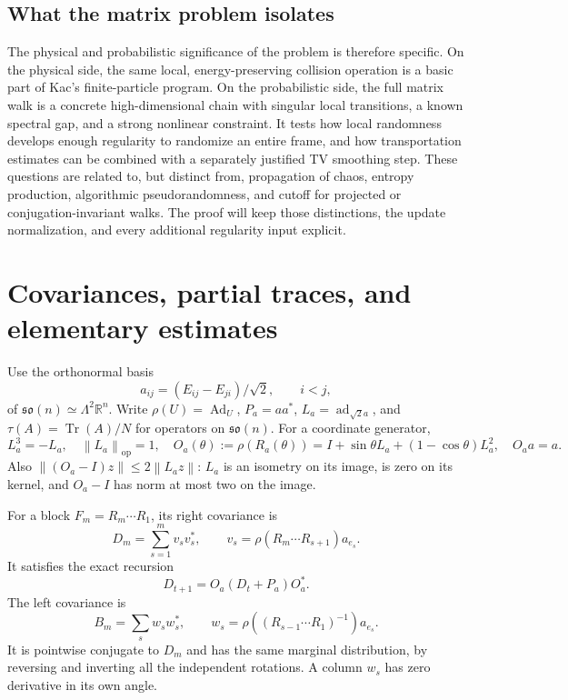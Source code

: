 \documentclass[11pt]{article}
\theoremstyle{definition}\newtheorem{definition}[theorem]{Definition}
\theoremstyle{remark}\newtheorem{remark}[theorem]{Remark}
\DeclareMathOperator{\Tr}{Tr}
\DeclareMathOperator{\Ad}{Ad}
\DeclareMathOperator{\ad}{ad}
\newcommand{\g}{\mathfrak{so}(n)}
\newcommand{\op}{\mathrm{op}}
\newcommand{\norm}[1]{\left\lVert#1\right\rVert}
\begin{document}
\subsection{What the matrix problem isolates}
The physical and probabilistic significance of the problem is therefore specific. On the physical side, the same local, energy-preserving collision operation is a basic part of Kac's finite-particle program. On the probabilistic side, the full matrix walk is a concrete high-dimensional chain with singular local transitions, a known spectral gap, and a strong nonlinear constraint. It tests how local randomness develops enough regularity to randomize an entire frame, and how transportation estimates can be combined with a separately justified TV smoothing step. These questions are related to, but distinct from, propagation of chaos, entropy production, algorithmic pseudorandomness, and cutoff for projected or conjugation-invariant walks. The proof will keep those distinctions, the update normalization, and every additional regularity input explicit.


\section{Covariances, partial traces, and elementary estimates}\label{sec:elementary}
Use the orthonormal basis
\[
 a_{ij}=(E_{ij}-E_{ji})/\sqrt2,\qquad i<j,
\]
of $\g\simeq\Lambda^2\mathbb R^n$. Write $\rho(U)=\Ad_U$, $P_a=aa^*$, $L_a=\ad_{\sqrt2a}$, and $\tau(A)=\Tr(A)/N$ for operators on $\g$. For a coordinate generator,
\begin{equation}\label{eq:coordinate-rotation}
 L_a^3=-L_a,\quad \norm{L_a}_{\op}=1,\quad
 O_a(\theta):=\rho(R_a(\theta))
 =I+\sin\theta L_a+(1-\cos\theta)L_a^2,\quad O_a a=a.
\end{equation}
Also $\norm{(O_a-I)z}\le2\norm{L_a z}$: $L_a$ is an isometry on its image, is zero on its kernel, and $O_a-I$ has norm at most two on the image.

For a block $F_m=R_m\cdots R_1$, its right covariance is
\[
 D_m=\sum_{s=1}^m v_sv_s^*,\qquad
 v_s=\rho(R_m\cdots R_{s+1})a_{e_s}.
\]
It satisfies the exact recursion
\begin{equation}\label{eq:cov-recursion}
 D_{t+1}=O_a(D_t+P_a)O_a^*.
\end{equation}
The left covariance is
\[
 B_m=\sum_s w_sw_s^*,\qquad
 w_s=\rho((R_{s-1}\cdots R_1)^{-1})a_{e_s}.
\]
It is pointwise conjugate to $D_m$ and has the same marginal distribution, by reversing and inverting all the independent rotations. A column $w_s$ has zero derivative in its own angle.
\end{document}
